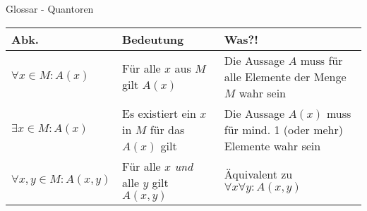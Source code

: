 \begin{frame}[fragile]{Glossar - Quantoren}
    \small
    \begin{tabular}{p{} p{} p{}}
        \toprule
        Abk.                         & Bedeutung                                        & Was?!                                                              \\
        \midrule
        $\forall x \in M : A(x)$     & Für alle $x$ aus $M$ gilt $A(x)$                 & Die Aussage $A$ muss für alle Elemente der Menge $M$ wahr sein     \\
        $\exists x \in M : A(x)$     & Es existiert ein $x$ in $M$ für das $A(x)$ gilt  & Die Aussage $A(x)$ muss für mind. 1 (oder mehr) Elemente wahr sein \\
        $\forall x,y \in M : A(x,y)$ & Für alle $x$ \textit{und} alle $y$ gilt $A(x,y)$ & Äquivalent zu $\forall x \forall y : A(x,y)$                       \\
        \bottomrule
    \end{tabular}
\end{frame}